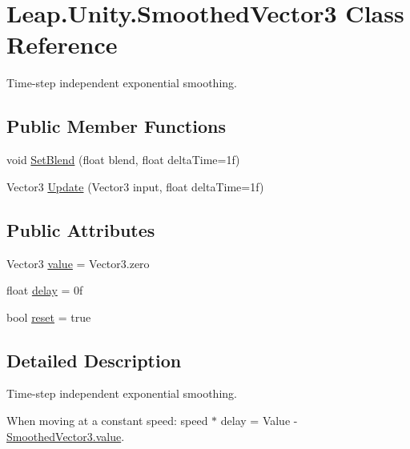 \hypertarget{class_leap_1_1_unity_1_1_smoothed_vector3}{}\section{Leap.\+Unity.\+Smoothed\+Vector3 Class Reference}
\label{class_leap_1_1_unity_1_1_smoothed_vector3}


Time-\/step independent exponential smoothing.  


\subsection*{Public Member Functions}
\begin{DoxyCompactItemize}
\item 
void \mbox{\hyperlink{class_leap_1_1_unity_1_1_smoothed_vector3_abd7ed7dbce4be629367a82bfea2661cd}{Set\+Blend}} (float blend, float delta\+Time=1f)
\item 
Vector3 \mbox{\hyperlink{class_leap_1_1_unity_1_1_smoothed_vector3_a2ee8eecdff94dfd862c61bae5f43e045}{Update}} (Vector3 input, float delta\+Time=1f)
\end{DoxyCompactItemize}
\subsection*{Public Attributes}
\begin{DoxyCompactItemize}
\item 
Vector3 \mbox{\hyperlink{class_leap_1_1_unity_1_1_smoothed_vector3_a24c176e970afb7be19a6c3510fdb6f46}{value}} = Vector3.\+zero
\item 
float \mbox{\hyperlink{class_leap_1_1_unity_1_1_smoothed_vector3_ad0c4115ffe93cefdde8d01d561833047}{delay}} = 0f
\item 
bool \mbox{\hyperlink{class_leap_1_1_unity_1_1_smoothed_vector3_ab37a26a80adc7f62e2aab6e5f161710b}{reset}} = true
\end{DoxyCompactItemize}


\subsection{Detailed Description}
Time-\/step independent exponential smoothing. 

When moving at a constant speed\+: speed $\ast$ delay = Value -\/ \mbox{\hyperlink{class_leap_1_1_unity_1_1_smoothed_vector3_a24c176e970afb7be19a6c3510fdb6f46}{Smoothed\+Vector3.\+value}}. 

